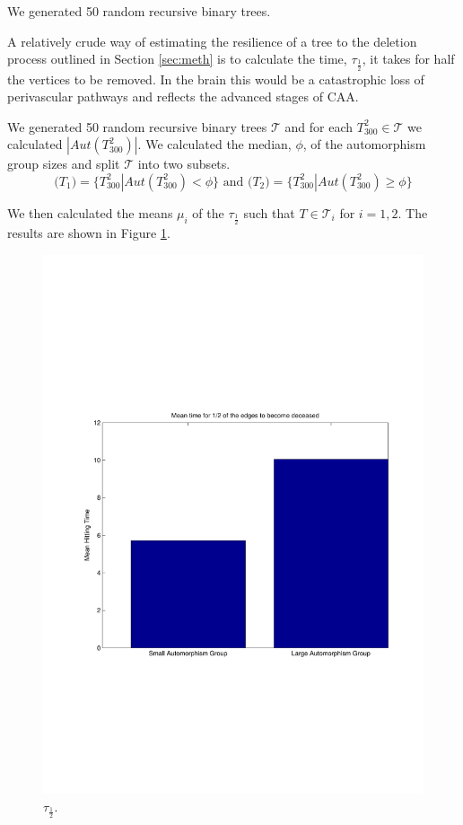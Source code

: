 \documentclass[12pt]{article} %
\theoremstyle{definition}
\begin{document}
We generated 50 random recursive binary trees.

A relatively crude way of estimating the resilience of a tree to the deletion process outlined in Section \ref{sec:meth} is to calculate the time, $\tau_{\frac{1}{2}}$,  it takes for half the vertices to be removed.  In the brain this would be a catastrophic loss of perivascular pathways and reflects the advanced stages of CAA.  

We generated 50 random recursive binary trees $\mathcal{T}$ and for each $T_{300}^{2} \in \mathcal{T}$ we calculated $|Aut(T_{300}^{2})|$.  We calculated the median, $\phi$, of the automorphism group sizes and split  $\mathcal{T}$  into two subsets.
\[\mathcal(T_{1}) = \{T_{300}^{2}  |Aut(T_{300}^{2}) < \phi\} \text{      and      } \mathcal(T_{2}) = \{T_{300}^{2}  |Aut(T_{300}^{2}) \geq \phi\} \]

We then calculated the means $\mu_{i}$ of the $\tau_{\frac{1}{2}}$ such that $T \in \mathcal{T}_{i}$ for $i= 1,2$. The results are shown in Figure \ref{t12}.

\begin{figure}[H]

              \centering
               \includegraphics[scale=0.15]{halof.pdf}
                \caption{$\tau_{\frac{1}{2}}$.}\label{t12}
\end{figure}
\end{document}
